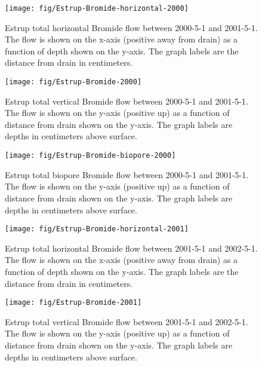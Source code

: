 \documentclass[a4paper]{article}
\begin{document}
\begin{figure}[htbp]
  \centering
  \texttt{[image: fig/Estrup-Bromide-horizontal-2000]}
  
  \caption{Estrup total horizontal Bromide flow between 2000-5-1 and
    2001-5-1.  The flow is shown on the x-axis (positive away from
    drain) as a function of depth shown on the y-axis.  The graph
    labels are the distance from drain in centimeters.}
  \label{fig:Estrup-Bromide-2000-horizontal}
\end{figure}\FloatBarrier

\begin{figure}[htbp]
  \centering
  \texttt{[image: fig/Estrup-Bromide-2000]}
  
  \caption{Estrup total vertical Bromide flow between 2000-5-1 and
    2001-5-1.  The flow is shown on the y-axis (positive up) as a
    function of distance from drain shown on the y-axis.  The graph
    labels are depths in centimeters above surface.}
  \label{fig:Estrup-Bromide-2000-vertical}
\end{figure}\FloatBarrier

\begin{figure}[htbp]
  \centering
  \texttt{[image: fig/Estrup-Bromide-biopore-2000]}
  
  \caption{Estrup total biopore Bromide flow between 2000-5-1 and
    2001-5-1.  The flow is shown on the y-axis (positive up) as a
    function of distance from drain shown on the y-axis.  The graph
    labels are depths in centimeters above surface.}
  \label{fig:Estrup-Bromide-biopore-2000}
\end{figure}\FloatBarrier

\begin{figure}[htbp]
  \centering
  \texttt{[image: fig/Estrup-Bromide-horizontal-2001]}
  
  \caption{Estrup total horizontal Bromide flow between 2001-5-1 and
    2002-5-1.  The flow is shown on the x-axis (positive away from
    drain) as a function of depth shown on the y-axis.  The graph
    labels are the distance from drain in centimeters.}
  \label{fig:Estrup-Bromide-2001-horizontal}
\end{figure}\FloatBarrier

\begin{figure}[htbp]
  \centering
  \texttt{[image: fig/Estrup-Bromide-2001]}
  
  \caption{Estrup total vertical Bromide flow between 2001-5-1 and
    2002-5-1.  The flow is shown on the y-axis (positive up) as a
    function of distance from drain shown on the y-axis.  The graph
    labels are depths in centimeters above surface.}
  \label{fig:Estrup-Bromide-2001-vertical}
\end{figure}\FloatBarrier
\end{document}
